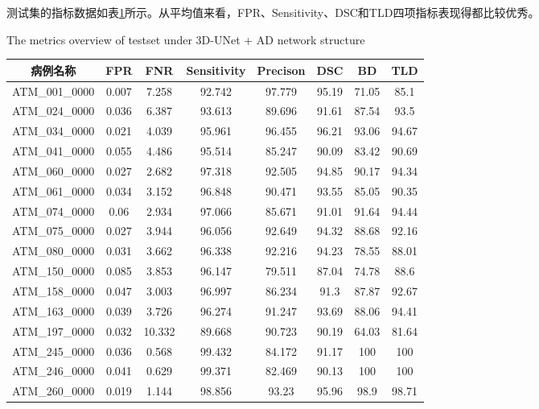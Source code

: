 测试集的指标数据如表\ref{tbl:3dunet_ad_metrics_testset}所示。从平均值来看，FPR、Sensitivity、DSC和TLD四项指标表现得都比较优秀。
\begin{table}[!htb]
    \centering
        {The metrics overview of testset under 3D-UNet + AD network structure}
    \label{tbl:3dunet_ad_metrics_testset}
    \begin{tabular}{cccccccc}
        \toprule
        病例名称 & FPR & FNR & Sensitivity & Precison & DSC & BD & TLD \\
        \midrule
        ATM\_001\_0000 & 0.007 & 7.258  & 92.742 & 97.779 & 95.19  & 71.05   & 85.1   \\
        ATM\_024\_0000 & 0.036 & 6.387  & 93.613 & 89.696 & 91.61  & 87.54   & 93.5   \\
        ATM\_034\_0000 & 0.021 & 4.039  & 95.961 & 96.455 & 96.21  & 93.06   & 94.67  \\
        ATM\_041\_0000 & 0.055 & 4.486  & 95.514 & 85.247 & 90.09  & 83.42   & 90.69  \\
        ATM\_060\_0000 & 0.027 & 2.682  & 97.318 & 92.505 & 94.85  & 90.17   & 94.34  \\
        ATM\_061\_0000 & 0.034 & 3.152  & 96.848 & 90.471 & 93.55  & 85.05   & 90.35  \\
        ATM\_074\_0000 & 0.06  & 2.934  & 97.066 & 85.671 & 91.01  & 91.64   & 94.44  \\
        ATM\_075\_0000 & 0.027 & 3.944  & 96.056 & 92.649 & 94.32  & 88.68   & 92.16  \\
        ATM\_080\_0000 & 0.031 & 3.662  & 96.338 & 92.216 & 94.23  & 78.55   & 88.01  \\
        ATM\_150\_0000 & 0.085 & 3.853  & 96.147 & 79.511 & 87.04  & 74.78   & 88.6   \\
        ATM\_158\_0000 & 0.047 & 3.003  & 96.997 & 86.234 & 91.3   & 87.87   & 92.67  \\
        ATM\_163\_0000 & 0.039 & 3.726  & 96.274 & 91.247 & 93.69  & 88.06   & 94.41  \\
        ATM\_197\_0000 & 0.032 & 10.332 & 89.668 & 90.723 & 90.19  & 64.03   & 81.64  \\
        ATM\_245\_0000 & 0.036 & 0.568  & 99.432 & 84.172 & 91.17  & 100     & 100    \\
        ATM\_246\_0000 & 0.041 & 0.629  & 99.371 & 82.469 & 90.13  & 100     & 100    \\
        ATM\_260\_0000 & 0.019 & 1.144  & 98.856 & 93.23  & 95.96  & 98.9    & 98.71  \\

\end{tabular}
\end{table}
